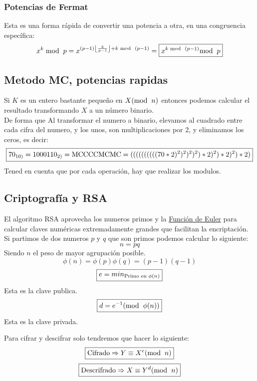 \subsubsection{Potencias de Fermat}
\noindent Esta es una forma rápida de convertir una potencia a otra, en una congruencia específica:
\[
        x^k\hspace{1mm}\textnormal{mod}\hspace{2mm}p = x^{(p-1)\left \lfloor \frac{k}{p-1} \right \rfloor + k\hspace{1mm}\textnormal{mod}\hspace{2mm}(p-1)}=\boxed{x^{k\hspace{1mm}\textnormal{mod}\hspace{2mm}(p-1)}\textnormal{mod}\hspace{2mm}p}
\]
\subsection{Metodo MC, potencias rapidas}
\noindent Si \(K\) es un entero bastante pequeño en \(X (\textnormal{mod}\hspace{2mm}n)\) entonces podemos calcular el resultado transformando \(X\) a un número binario. \\De forma que Al transformar el numero a binario, elevamos al cuadrado entre cada cifra del numero, y los unos, son multiplicaciones por 2, y eliminamos los ceros, es decir:
\[
        \boxed{70_{10)} = 1000110_{2)} = \textnormal{M}\textnormal{C}\textnormal{C}\textnormal{C}\textnormal{C}\textnormal{M}\textnormal{C}\textnormal{M}\textnormal{C} = ((((((((((70*2)^2)^2)^2)^2)*2)^2)*2)^2)*2)}
\]
\noindent Tened en cuenta que por cada operación, hay que realizar los modulos.
\subsection{Criptografía y RSA}
\noindent El algoritmo RSA aprovecha los numeros primos y la \underline{Función de Euler} para calcular claves numéricas extremadamente grandes que facilitan la encriptación.\\ Si partimos de dos numeros \(p\) y \(q\) que son primos podemos calcular lo siguiente:
\[
        \boxed{n = pq}
\]
\noindent Siendo \(n\) el peso de mayor agrupación posible.
\[
        \boxed{\phi(n) = \phi(p)\phi(q) = (p-1)(q-1)}
\]
\[
        \boxed{e = min_{\textnormal{Primo en \(\phi(n)\)}}}
\]
\noindent Esta es la clave publica.
\[
        \boxed{d = e^{-1} (\textnormal{mod} \hspace{2mm} \phi(n))}
\]
\noindent Esta es la clave privada.\par
\noindent Para cifrar y descifrar solo tendremos que hacer lo siguiente:
\[
        \boxed{\textnormal{Cifrado}\Rightarrow  Y \equiv X^e (\textnormal{mod}\hspace{2mm}n)}
\]
\[
        \boxed{\textnormal{Descrifrado}\Rightarrow X \equiv Y^d (\textnormal{mod}\hspace{2mm}n)}
\]